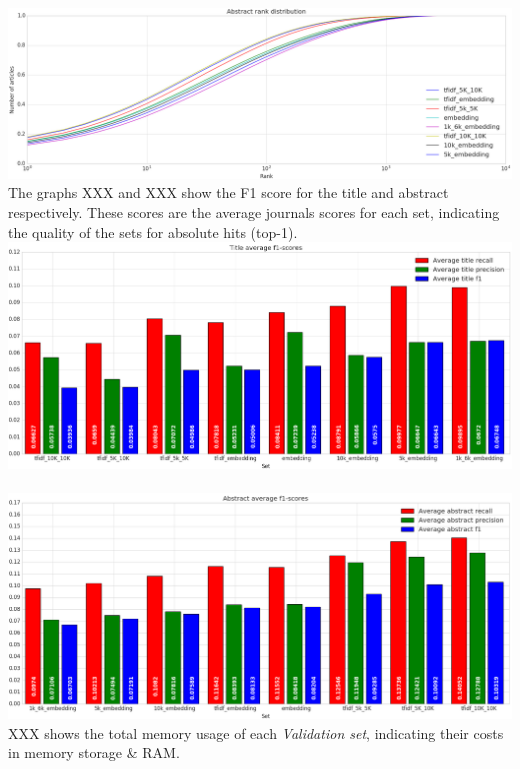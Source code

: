 \documentclass[../../Thesis.tex]{subfiles}
\begin{document}
\vspace{0.2in}\\
\includegraphics[width=6.5in]{Plots/Abstract_rank_distribution}\\
\clearpage
{}
The graphs XXX and XXX show the F1 score for the title and abstract respectively. These scores are the average journals scores for each set, indicating the quality of the sets for absolute hits (top-1).\\
\includegraphics[width=6.5in]{Plots/Title_avg_f1}\\
\vspace{0.2in}\\
\includegraphics[width=6.5in]{Plots/Abstract_avg_f1}\\
\clearpage
{}
XXX shows the total memory usage of each \textit{Validation set}, indicating their costs in memory storage \& RAM.\\
\end{document}
